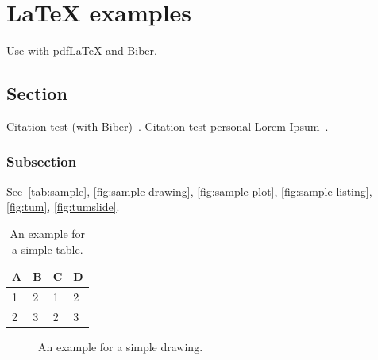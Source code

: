 
\chapter{LaTeX examples}\label{chapter:latex_example}
Use with pdfLaTeX and Biber.

\section{Section}
Citation test (with Biber)~\parencite{latex}.
Citation test personal Lorem Ipsum~\parencite{acosta2011anapsid}.

\subsection{Subsection}

See~\autoref{tab:sample}, \autoref{fig:sample-drawing}, \autoref{fig:sample-plot}, \autoref{fig:sample-listing}, \autoref{fig:tum}, \autoref{fig:tumslide}.

\begin{table}[htpb]
  \caption[Example table]{An example for a simple table.}\label{tab:sample}
  \centering
  \begin{tabular}{l l l l}
    \toprule
      A & B & C & D \\
    \midrule
      1 & 2 & 1 & 2 \\
      2 & 3 & 2 & 3 \\
    \bottomrule
  \end{tabular}
\end{table}

\begin{figure}[htpb]
  \centering
  \caption[Example drawing]{An example for a simple drawing.}\label{fig:sample-drawing}
\end{figure}

